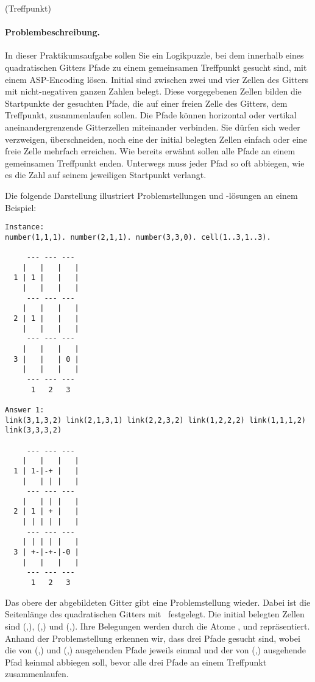 \documentclass[a4paper,12pt,ngerman]{article}
\begin{document}
\begin{PraktikumsAufgabe}{1}{(Treffpunkt)}
\vspace*{-4mm}
\paragraph{Problembeschreibung.}
%
In dieser Praktikumsaufgabe sollen Sie ein Logikpuzzle, bei dem innerhalb eines quadratischen Gitters Pfade zu einem gemeinsamen Treffpunkt gesucht sind, mit einem ASP-Encoding lösen.
Initial sind zwischen zwei und vier Zellen des Gitters mit nicht-negativen ganzen Zahlen belegt.
Diese vorgegebenen Zellen bilden die Startpunkte der gesuchten Pfade, die auf einer freien Zelle des Gitters, dem Treffpunkt, zusammenlaufen sollen.
Die Pfade können horizontal oder vertikal aneinandergrenzende Gitterzellen miteinander verbinden.
Sie dürfen sich weder verzweigen, überschneiden, noch eine der initial belegten Zellen einfach oder eine freie Zelle mehrfach erreichen.
Wie bereits erwähnt sollen alle Pfade an einem gemeinsamen Treffpunkt enden.
Unterwegs muss jeder Pfad so oft abbiegen, wie es die Zahl auf seinem jeweiligen Startpunkt verlangt.

\noindent
Die folgende Darstellung illustriert Problemstellungen und -lösungen an einem Beispiel:
{\footnotesize
\begin{verbatim}
Instance:
number(1,1,1). number(2,1,1). number(3,3,0). cell(1..3,1..3).

     --- --- ---
    |   |   |   |
  1 | 1 |   |   |
    |   |   |   |
     --- --- ---
    |   |   |   |
  2 | 1 |   |   |
    |   |   |   |
     --- --- ---
    |   |   |   |
  3 |   |   | 0 |
    |   |   |   |
     --- --- ---
      1   2   3

Answer 1:
link(3,1,3,2) link(2,1,3,1) link(2,2,3,2) link(1,2,2,2) link(1,1,1,2) link(3,3,3,2)

     --- --- ---
    |   |   |   |
  1 | 1-|-+ |   |
    |   | | |   |
     --- --- ---
    |   | | |   |
  2 | 1 | + |   |
    | | | | |   |
     --- --- ---
    | | | | |   |
  3 | +-|-+-|-0 |
    |   |   |   |
     --- --- ---
      1   2   3

\end{verbatim}%
}

\noindent
Das obere der abgebildeten Gitter gibt eine Problemstellung wieder.
Dabei ist die Seitenlänge des quadratischen Gitters mit~ festgelegt.
Die initial belegten Zellen sind (,), (,) und (,).
Ihre Belegungen werden durch die Atome
,  und  repräsentiert.
Anhand der Problemstellung erkennen wir, dass drei Pfade gesucht sind, wobei die von (,) und (,) ausgehenden
Pfade jeweils einmal und der von (,) ausgehende Pfad keinmal abbiegen soll, bevor alle drei Pfade an einem Treffpunkt zusammenlaufen.


\end{PraktikumsAufgabe}
\end{document}
